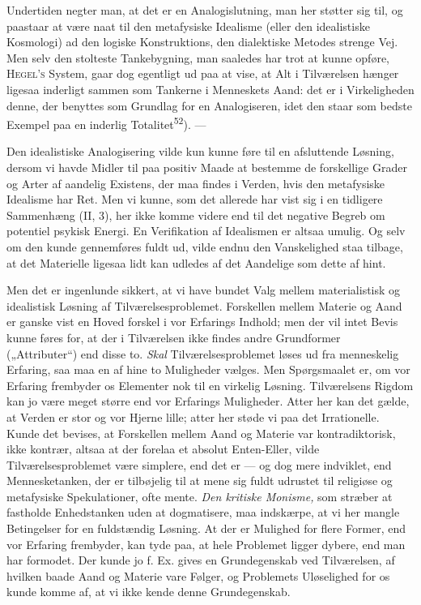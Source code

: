 \documentclass[12pt,a4paper,openany]{book}
\newcommand{\opage}[1]{\marginnote{\footnotesize\textit{[#1]}}}
\begin{document}
Undertiden negter man, at det er en Analogislutning, man her støtter sig til,
og paastaar at være naat til den metafysiske Idealisme (eller den idealistiske
Kosmologi) ad den logiske Konstruktions, den dialektiske Metodes strenge Vej.
Men selv den stolteste Tankebygning, man saaledes har trot at kunne opføre,
\textsc{Hegel's} System, gaar dog egentligt ud paa at vise, at Alt i
Tilværelsen hænger ligesaa inderligt sammen som Tankerne i Menneskets Aand: det
er i Virkeligheden denne, der benyttes som Grundlag for en Analogiseren, idet
den staar som bedste Exempel paa en inderlig Totalitet\textsuperscript{52}). ---

Den idealistiske Analogisering vilde kun kunne føre til en afsluttende Løsning,
dersom vi havde Midler til paa positiv Maade at bestemme de forskellige Grader
og Arter af aandelig Existens, der maa findes i Verden, hvis den metafysiske
Idealisme har Ret. Men vi kunne, som det allerede har vist sig i en tidligere
Sammenhæng (II, 3), her ikke komme videre end til det negative Begreb om
potentiel psykisk Energi. En Verifikation af Idealismen er altsaa umulig. Og
selv om den kunde gennemføres fuldt ud, vilde endnu den Vanskelighed staa
tilbage, at det Materielle ligesaa lidt kan udledes af det Aandelige som dette
af hint.

Men det er ingenlunde sikkert, at vi have bundet Valg mellem materialistisk og
idealistisk Løsning af Tilværelsesproblemet. Forskellen mellem Materie og Aand
er ganske vist en Hoved%
\opage{65}forskel i vor Erfarings Indhold; men der vil intet Bevis kunne føres
for, at der i Tilværelsen ikke findes andre Grundformer („Attributer“) end
disse to. \textit{Skal} Tilværelsesproblemet løses ud fra menneskelig Erfaring,
saa maa en af hine to Muligheder vælges. Men Spørgsmaalet er, om vor Erfaring
frembyder os Elementer nok til en virkelig Løsning. Tilværelsens Rigdom kan jo
være meget større end vor Erfarings Muligheder. Atter her kan det gælde, at
Verden er stor og vor Hjerne lille; atter her støde vi paa det Irrationelle.
Kunde det bevises, at Forskellen mellem Aand og Materie var kontradiktorisk,
ikke kontrær, altsaa at der forelaa et absolut Enten-Eller, vilde
Tilværelsesproblemet være simplere, end det er --- og dog mere indviklet, end
Mennesketanken, der er tilbøjelig til at mene sig fuldt udrustet til religiøse
og metafysiske Spekulationer, ofte mente. \textit{Den kritiske Monisme,} som
stræber at fastholde Enhedstanken uden at dogmatisere, maa indskærpe, at vi her
mangle Betingelser for en fuldstændig Løsning. At der er Mulighed for flere
Former, end vor Erfaring frembyder, kan tyde paa, at hele Problemet ligger
dybere, end man har formodet. Der kunde jo f. Ex. gives en Grundegenskab ved
Tilværelsen, af hvilken baade Aand og Materie vare Følger, og Problemets
Uløselighed for os kunde komme af, at vi ikke kende denne Grundegenskab.
\end{document}
